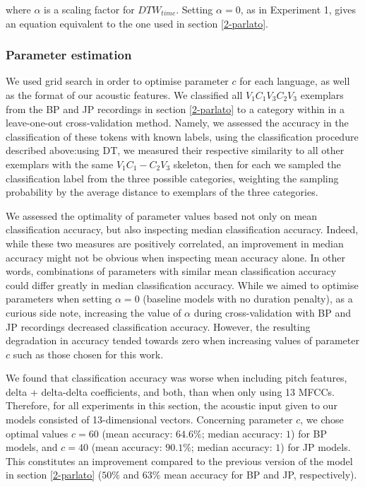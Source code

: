 where $\alpha$ is a scaling factor for $DTW_{time}$. Setting $\alpha = 0$, as in Experiment 1, gives an equation equivalent to the one used in section \ref{2-parlato}.

\subsubsection{Parameter estimation}
We used grid search in order to optimise parameter $c$ for each language, as well as the format of our acoustic features. We classified all $V_1C_1V_3C_2V_3$ exemplars from the BP and JP recordings in section \ref{2-parlato} to a category within  in a leave-one-out cross-validation method. Namely, we assessed the accuracy in the classification of these tokens with known labels, using the classification procedure described above:using DT, we measured their respective similarity to all other exemplars with the same $V_1C_1-C_2V_3$ skeleton, then for each we sampled the classification label from the three possible categories, weighting the sampling probability by the average distance to exemplars of the three categories.

We assessed the optimality of parameter values based not only on mean classification accuracy, but also inspecting median classification accuracy. Indeed, while these two measures are positively correlated, an improvement in median accuracy might not be obvious when inspecting mean accuracy alone. In other words, combinations of parameters with similar mean classification accuracy could differ greatly in median classification accuracy.
While we aimed to optimise parameters when setting $\alpha = 0$ (baseline models with no duration penalty), as a curious side note, increasing the value of $\alpha$ during cross-validation with BP and JP recordings decreased classification accuracy. However, the resulting degradation in accuracy tended towards zero when increasing values of parameter $c$ such as those chosen for this work.

We found that classification accuracy was worse when including pitch features, delta + delta-delta coefficients, and both, than when only using 13 MFCCs. Therefore, for all experiments in this section, the acoustic input given to our models consisted of 13-dimensional vectors. Concerning parameter $c$, we chose optimal values $c = 60$ (mean accuracy: $64.6\%$; median accuracy: $1$) for BP models, and $c = 40$ (mean accuracy: $90.1\%$; median accuracy: $1$) for JP models. This constitutes an improvement compared to the previous version of the model in section \ref{2-parlato} ($50\%$ and $63\%$ mean accuracy for BP and JP, respectively). 

